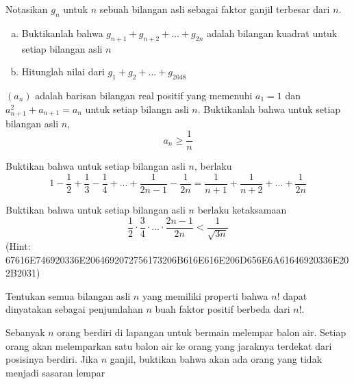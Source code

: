 \documentclass[11pt]{scrartcl}
\begin{document}
\begin{problem}
     Notasikan $g_n$ untuk $n$ sebuah bilangan asli sebagai faktor ganjil terbesar dari $n$.
    \begin{enumerate}[(a)]
        \item Buktikanlah bahwa $g_{n + 1} + g_{n + 2} + ... + g_{2n}$ adalah bilangan kuadrat untuk setiap bilangan asli $n$
        \item Hitunglah nilai dari $g_1 + g_2 + ... + g_{2048}$
    \end{enumerate}
\end{problem}

\begin{problem}
     $(a_n)$ adalah barisan bilangan real positif yang memenuhi $a_1 = 1$ dan $a_{n + 1}^2 + a_{n + 1} = a_n$ untuk setiap bilangn asli $n$. Buktikanlah bahwa untuk setiap bilangan asli $n$, \[a_n \geq \frac{1}{n}\]
\end{problem}

\begin{problem}
     Buktikan bahwa untuk setiap bilangan asli $n$, berlaku \[1 - \frac{1}{2} + \frac{1}{3} - \frac{1}{4} + ... + \frac{1}{2n - 1} - \frac{1}{2n} = \frac{1}{n + 1} + \frac{1}{n + 2} + ... + \frac{1}{2n}\]
\end{problem}

\begin{problem}
     Buktikan bahwa untuk setiap bilangan asli $n$ berlaku ketaksamaan \[\frac{1}{2} \cdot \frac{3}{4}  \cdot ... \cdot \frac{2n - 1}{2n} < \frac{1}{\sqrt{3n}}\]
    (Hint: 67616E746920336E2064692072756173206B616E616E206D656E6A61646920336E202B2031)
\end{problem}

\begin{problem}
     Tentukan semua bilangan asli $n$ yang memiliki properti bahwa $n!$ dapat dinyatakan sebagai penjumlahan $n$ buah faktor positif berbeda dari $n!$.
\end{problem}

\begin{problem}
     Sebanyak $n$ orang berdiri di lapangan untuk bermain melempar balon air. Setiap orang akan melemparkan satu balon air ke orang yang jaraknya terdekat dari posisinya berdiri. Jika $n$ ganjil, buktikan bahwa akan ada orang yang tidak menjadi sasaran lempar 
\end{problem}
\end{document}
